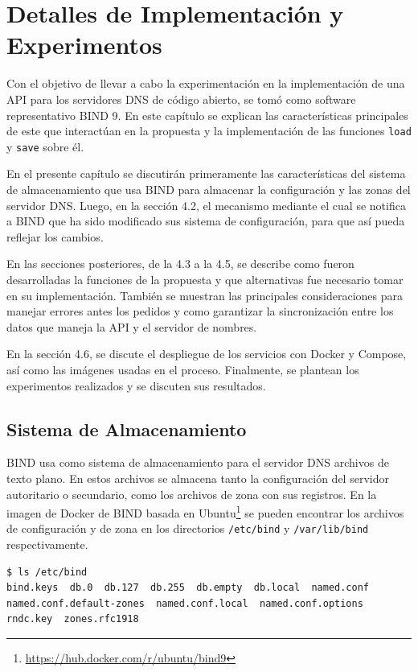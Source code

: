 \chapter{Detalles de Implementación y Experimentos}\label{chapter:implementation}

Con el objetivo de llevar a cabo la experimentación en la implementación de una API para los servidores DNS de código abierto, se tomó como software representativo BIND 9. En este capítulo se explican las características principales de este que interactúan en la propuesta y la implementación de las funciones \verb|load| y \verb|save| sobre él.

En el presente capítulo se discutirán primeramente las características del sistema de almacenamiento que usa BIND para almacenar la configuración y las zonas del servidor DNS. Luego, en la sección 4.2, el mecanismo mediante el cual se notifica a BIND que ha sido modificado sus sistema de configuración, para que así pueda reflejar los cambios.

En las secciones posteriores, de la 4.3 a la 4.5, se describe como fueron desarrolladas la funciones de la propuesta y que alternativas fue necesario tomar en su implementación. También se muestran las principales consideraciones para manejar errores antes los pedidos y como garantizar la sincronización entre los datos que maneja la API y el servidor de nombres.

En la sección 4.6, se discute el despliegue de los servicios con Docker y Compose, así como las imágenes usadas en el proceso. Finalmente, se plantean los experimentos realizados y se discuten sus resultados.

\section{Sistema de Almacenamiento}\label{sec:bind-storage}
BIND usa como sistema de almacenamiento para el servidor DNS archivos de texto plano. En estos archivos se almacena tanto la configuración del servidor autoritario o secundario, como los archivos de zona con sus registros. En la imagen de Docker de BIND basada en Ubuntu\footnote{\url{https://hub.docker.com/r/ubuntu/bind9}} se pueden encontrar los archivos de configuración y de zona en los directorios \verb+/etc/bind+ y \verb+/var/lib/bind+ respectivamente.

\begin{lstlisting}[frame=single, numbers=none, caption=Contenido del directorio \textbf{/etc/bind}.]
$ ls /etc/bind
bind.keys  db.0  db.127  db.255  db.empty  db.local  named.conf
named.conf.default-zones  named.conf.local  named.conf.options
rndc.key  zones.rfc1918
\end{lstlisting}

